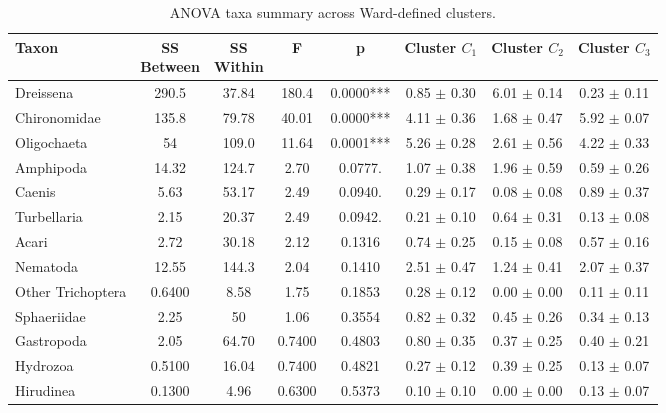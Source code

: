 \begin{table}[htbp]
  \centering
  \caption[ANOVA Taxa (Ward Clustering)]{ANOVA taxa summary across Ward-defined clusters.}
  \label{tab:WardsClustering_tables_anova_taxa}
  \scriptsize
  \setlength{\tabcolsep}{2pt}
  \renewcommand{\arraystretch}{1.08}
  \begin{tabular*}{\textwidth}{@{\extracolsep{\fill}}lccccccc@{}}
    \toprule
    Taxon & \makecell[c]{SS\\Between} & \makecell[c]{SS\\Within} & F & p & \makecell[c]{Cluster\\$C_{1}$} & \makecell[c]{Cluster\\$C_{2}$} & \makecell[c]{Cluster\\$C_{3}$} \\
    \midrule
    Dreissena & 290.5 & 37.84 & 180.4 & 0.0000*** & 0.85 $\pm$ 0.30 & 6.01 $\pm$ 0.14 & 0.23 $\pm$ 0.11 \\
    Chironomidae & 135.8 & 79.78 & 40.01 & 0.0000*** & 4.11 $\pm$ 0.36 & 1.68 $\pm$ 0.47 & 5.92 $\pm$ 0.07 \\
    Oligochaeta & 54 & 109.0 & 11.64 & 0.0001*** & 5.26 $\pm$ 0.28 & 2.61 $\pm$ 0.56 & 4.22 $\pm$ 0.33 \\
    Amphipoda & 14.32 & 124.7 & 2.70 & 0.0777. & 1.07 $\pm$ 0.38 & 1.96 $\pm$ 0.59 & 0.59 $\pm$ 0.26 \\
    Caenis & 5.63 & 53.17 & 2.49 & 0.0940. & 0.29 $\pm$ 0.17 & 0.08 $\pm$ 0.08 & 0.89 $\pm$ 0.37 \\
    Turbellaria & 2.15 & 20.37 & 2.49 & 0.0942. & 0.21 $\pm$ 0.10 & 0.64 $\pm$ 0.31 & 0.13 $\pm$ 0.08 \\
    Acari & 2.72 & 30.18 & 2.12 & 0.1316 & 0.74 $\pm$ 0.25 & 0.15 $\pm$ 0.08 & 0.57 $\pm$ 0.16 \\
    Nematoda & 12.55 & 144.3 & 2.04 & 0.1410 & 2.51 $\pm$ 0.47 & 1.24 $\pm$ 0.41 & 2.07 $\pm$ 0.37 \\
    Other Trichoptera & 0.6400 & 8.58 & 1.75 & 0.1853 & 0.28 $\pm$ 0.12 & 0.00 $\pm$ 0.00 & 0.11 $\pm$ 0.11 \\
    Sphaeriidae & 2.25 & 50 & 1.06 & 0.3554 & 0.82 $\pm$ 0.32 & 0.45 $\pm$ 0.26 & 0.34 $\pm$ 0.13 \\
    Gastropoda & 2.05 & 64.70 & 0.7400 & 0.4803 & 0.80 $\pm$ 0.35 & 0.37 $\pm$ 0.25 & 0.40 $\pm$ 0.21 \\
    Hydrozoa & 0.5100 & 16.04 & 0.7400 & 0.4821 & 0.27 $\pm$ 0.12 & 0.39 $\pm$ 0.25 & 0.13 $\pm$ 0.07 \\
    Hirudinea & 0.1300 & 4.96 & 0.6300 & 0.5373 & 0.10 $\pm$ 0.10 & 0.00 $\pm$ 0.00 & 0.13 $\pm$ 0.07 \\

\end{tabular*}
\end{table}
